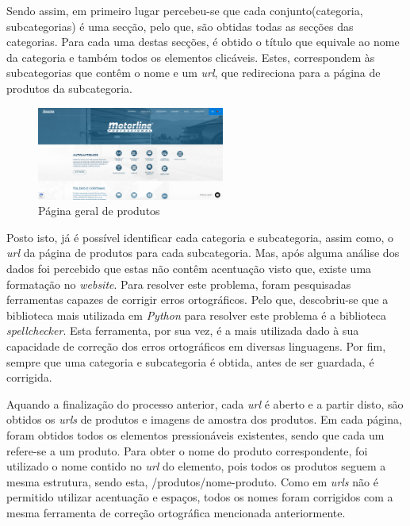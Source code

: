 Sendo assim, em primeiro lugar percebeu-se que cada conjunto(categoria, subcategorias) é uma secção, pelo que, são obtidas todas as secções das categorias. Para cada uma destas secções, é obtido o título que equivale ao nome da categoria e também todos os elementos clicáveis. Estes, correspondem às subcategorias que contêm o nome e um \textit{url}, que redireciona para a página de produtos da subcategoria.

\begin{figure}[htb]
  \centering
  
  \includegraphics[width=0.55\textwidth]{images/implementacao/scraper/pagina_geral_produtos.png}
  \caption{Página geral de produtos}
  \label{fig:50}
\end{figure}

Posto isto, já é possível identificar cada categoria e subcategoria, assim como, o \textit{url} da página de produtos para cada subcategoria. Mas, após alguma análise dos dados foi percebido que estas não contêm acentuação visto que, existe uma formatação no \textit{website}. Para resolver este problema, foram pesquisadas ferramentas capazes de corrigir erros ortográficos. Pelo que, descobriu-se que a biblioteca mais utilizada em \textit{Python} para resolver este problema é a biblioteca \textit{spellchecker}. Esta ferramenta, por sua vez, é a mais utilizada dado à sua capacidade de correção dos erros ortográficos em diversas linguagens. Por fim, sempre que uma categoria e subcategoria é obtida, antes de ser guardada, é corrigida.


Aquando a finalização do processo anterior, cada \textit{url} é aberto e a partir disto, são obtidos os \textit{urls} de produtos e imagens de amostra dos produtos. Em cada página, foram obtidos todos os elementos pressionáveis existentes, sendo que cada um refere-se a um produto. Para obter o nome do produto correspondente, foi utilizado o nome contido no \textit{url} do elemento, pois todos os produtos seguem a mesma estrutura, sendo esta, /produtos/nome-produto. Como em \textit{urls} não é permitido utilizar acentuação e espaços, todos os nomes foram corrigidos com a mesma ferramenta de correção ortográfica mencionada anteriormente.

